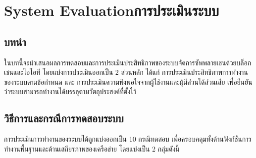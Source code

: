 \chapter{\ifproject%
\ifenglish System Evaluation\else การประเมินระบบ\fi
\fi}

\section{บทนำ}
ในบทนี้จะนำเสนอผลการทดสอบและการประเมินประสิทธิภาพของระบบจัดการซัพพลายเชนด้วยบล็อกเชนและไอโอที โดยแบ่งการประเมินออกเป็น 2 ส่วนหลัก ได้แก่ การประเมินประสิทธิภาพการทำงานของระบบตามข้อกำหนด และ การประเมินความพึงพอใจจากผู้ใช้งานและผู้มีส่วนได้ส่วนเสีย เพื่อยืนยันว่าระบบสามารถทำงานได้บรรลุตามวัตถุประสงค์ที่ตั้งไว้

\section{วิธีการและกรณีการทดสอบระบบ} 
การประเมินการทำงานของระบบได้ถูกแบ่งออกเป็น 10 กรณีทดสอบ เพื่อครอบคลุมทั้งด้านฟังก์ชันการทำงานพื้นฐานและด้านเสถียรภาพของเครือข่าย โดยแบ่งเป็น 2 กลุ่มดังนี้

